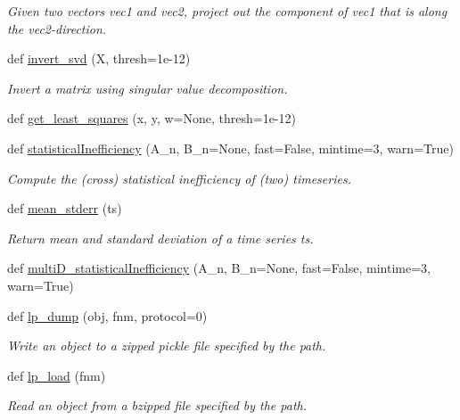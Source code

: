 \begin{DoxyCompactItemize}
\begin{DoxyCompactList}\small\item\em Given two vectors vec1 and vec2, project out the component of vec1 that is along the vec2-\/direction. \end{DoxyCompactList}\item 
def \hyperlink{namespacesrc_1_1nifty_a0943d024bad450c0f5aa277edcfb72ba}{invert\+\_\+svd} (X, thresh=1e-\/12)
\begin{DoxyCompactList}\small\item\em Invert a matrix using singular value decomposition. \end{DoxyCompactList}\item 
def \hyperlink{namespacesrc_1_1nifty_a83182c45477fe8ec241bedad494dc0a9}{get\+\_\+least\+\_\+squares} (x, y, w=None, thresh=1e-\/12)
\item 
def \hyperlink{namespacesrc_1_1nifty_a7e999b6e83b7bd69cdb8ec48d3b5bb78}{statistical\+Inefficiency} (A\+\_\+n, B\+\_\+n=None, fast=False, mintime=3, warn=True)
\begin{DoxyCompactList}\small\item\em Compute the (cross) statistical inefficiency of (two) timeseries. \end{DoxyCompactList}\item 
def \hyperlink{namespacesrc_1_1nifty_a52c467f044a58c56d85fc69b4d6274ad}{mean\+\_\+stderr} (ts)
\begin{DoxyCompactList}\small\item\em Return mean and standard deviation of a time series ts. \end{DoxyCompactList}\item 
def \hyperlink{namespacesrc_1_1nifty_ae6a4c098b47b62b0d94ca8015134597f}{multi\+D\+\_\+statistical\+Inefficiency} (A\+\_\+n, B\+\_\+n=None, fast=False, mintime=3, warn=True)
\item 
def \hyperlink{namespacesrc_1_1nifty_aed3eba850f6ddf4538d09ee61d19e4bd}{lp\+\_\+dump} (obj, fnm, protocol=0)
\begin{DoxyCompactList}\small\item\em Write an object to a zipped pickle file specified by the path. \end{DoxyCompactList}\item 
def \hyperlink{namespacesrc_1_1nifty_ac39961fd8c4c603c68b53cdd6b577fef}{lp\+\_\+load} (fnm)
\begin{DoxyCompactList}\small\item\em Read an object from a bzipped file specified by the path. \end{DoxyCompactList}\item 

\end{DoxyCompactItemize}
